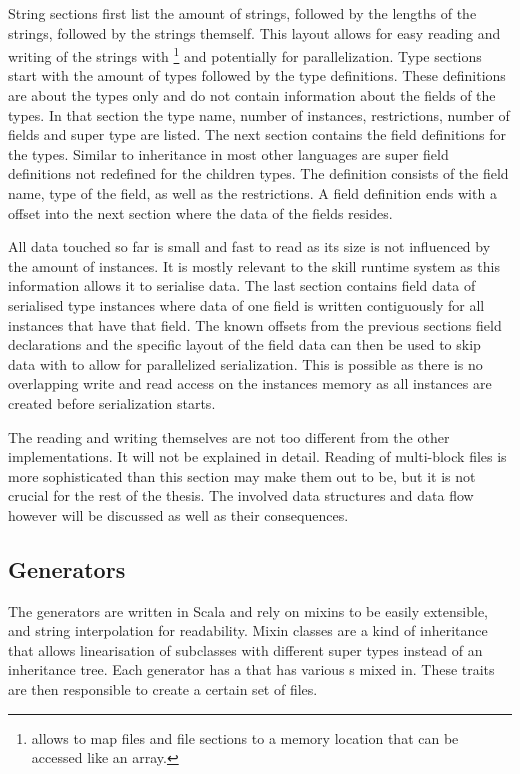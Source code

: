 \documentclass[thesis]{subfiles}
\begin{document}
    String sections first list the amount of strings, followed by the lengths of the strings, followed by the strings themself.
    This layout allows for easy reading and writing of the strings with \footnote{
       allows to map files and file sections to a memory location that can be accessed like an array.
    } and potentially for parallelization.
    Type sections start with the amount of types followed by the type definitions.
    These definitions are about the types only and do not contain information about the fields of the types.
    In that section the type name, number of instances, restrictions, number of fields and super type are listed.
    The next section contains the field definitions for the types.
    Similar to inheritance in most other languages are super field definitions not redefined for the children types.
    The definition consists of the field name, type of the field, as well as the restrictions.
    A field definition ends with a offset into the next section where the data of the fields resides.
    \autocite{skill-tr}

    All data touched so far is small and fast to read as its size is not influenced by the amount of instances.
    It is mostly relevant to the \gls{skill} runtime system as this information allows it to serialise data.
    The last section contains field data of serialised type instances where data of one field is written contiguously for all instances that have that field.
    The known offsets from the previous sections field declarations and the specific layout of the field data can then be used to skip data with  to allow for parallelized serialization.
    This is possible as there is no overlapping write and read access on the instances memory as all instances are created before serialization starts.
    \autocite{skill-tr}

    The reading and writing themselves are not too different from the other implementations.
    It will not be explained in detail.
    Reading of multi-block files is more sophisticated than this section may make them out to be, but it is not crucial for the rest of the thesis.
    The involved data structures and data flow however will be discussed as well as their consequences.

  \subsection{Generators}
    The generators are written in Scala and rely on mixins to be easily extensible, and string interpolation for readability.
    Mixin classes are a kind of inheritance that allows linearisation of subclasses with different super types instead of an inheritance tree.\autocite[117f.]{oop-inter}
    Each generator has a   that has various s mixed in.
    These traits are then responsible to create a certain set of files.
\end{document}
